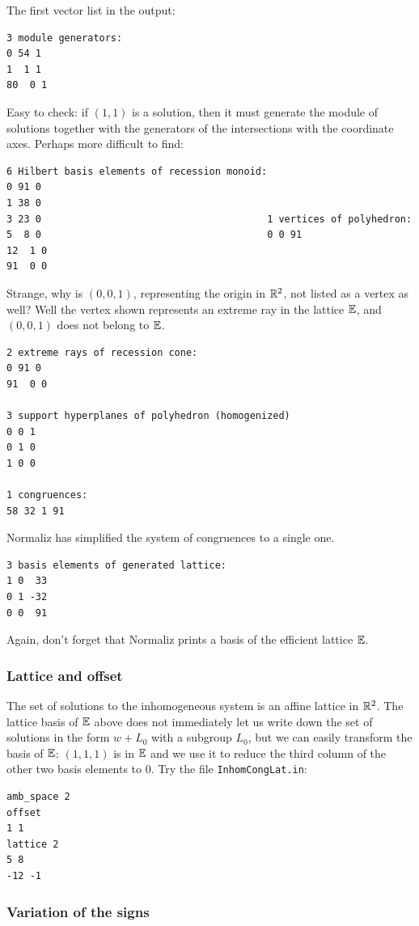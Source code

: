 The first vector list in the output:

\begin{Verbatim}
3 module generators:
0 54 1
1  1 1
80  0 1
\end{Verbatim}
Easy to check: if $(1,1)$ is a solution, then it must generate the module of solutions together with the generators of the intersections with the coordinate axes. Perhaps more difficult to find:
\begin{Verbatim}
6 Hilbert basis elements of recession monoid:
0 91 0
1 38 0
3 23 0                                       1 vertices of polyhedron:
5  8 0                                       0 0 91
12  1 0
91  0 0
\end{Verbatim}
Strange, why is $(0,0,1)$, representing the origin in ${\mathbb R}^2$, not listed as a vertex as well?
Well the vertex shown represents an extreme ray in the lattice ${\mathbb E}$, and $(0,0,1)$ does not belong to ${\mathbb E}$.

\begin{Verbatim}
2 extreme rays of recession cone:
0 91 0
91  0 0

3 support hyperplanes of polyhedron (homogenized)
0 0 1
0 1 0
1 0 0

1 congruences:
58 32 1 91
\end{Verbatim}
Normaliz has simplified the system of congruences to a single one.
\begin{Verbatim}
3 basis elements of generated lattice:
1 0  33
0 1 -32
0 0  91
\end{Verbatim}
Again, don't forget that Normaliz prints a basis of the efficient lattice ${\mathbb E}$.

\subsubsection{Lattice and offset}\label{offset_ex}

The set of solutions to the inhomogeneous system is an affine lattice in ${\mathbb R}^2$. The lattice basis of ${\mathbb E}$ above does not immediately let us write down the set of solutions in the form $w+L_0$ with a subgroup $L_0$, but we can easily transform the basis of ${\mathbb E}$: $(1,1,1)$ is in ${\mathbb E}$ and we use it to reduce the third column of the other two basis elements to $0$. Try the file \verb|InhomCongLat.in|:

\begin{Verbatim}
amb_space 2
offset
1 1
lattice 2
5 8
-12 -1
\end{Verbatim}


\subsubsection{Variation of the signs}\label{sign_ex}

